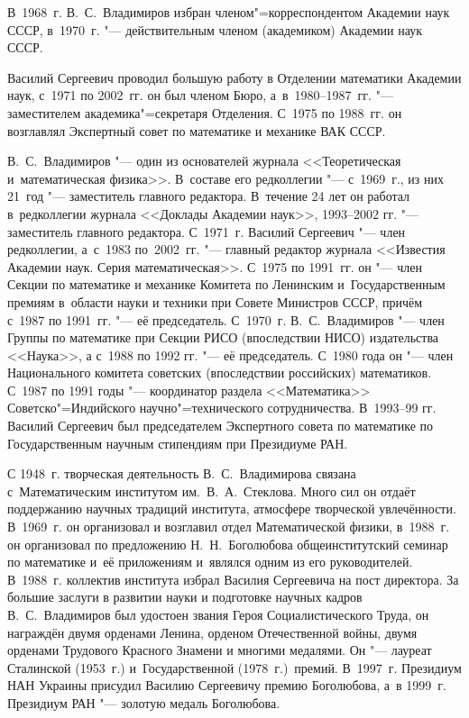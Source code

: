 В~1968~г. В.~С.~Владимиров избран членом"=корреспондентом Академии наук СССР, в~1970~г. "--- действительным членом (академиком) Академии наук СССР.


Василий Сергеевич проводил большую работу в Отделении математики Академии наук, с~1971  по 2002~гг. он был членом Бюро, а~в~1980--1987~гг. "--- заместителем академика"=секретаря Отделения. 
С~1975 по 1988~гг. он возглавлял Экспертный совет по математике и механике ВАК СССР.


В.~С.~Владимиров "--- один из основателей журнала <<Теоретическая и~математическая физика>>. 
В~составе его редколлегии "--- с~1969~г., из них 21~год "--- заместитель главного редактора. 
В~течение 24 лет он работал в~редколлегии журнала <<Доклады Академии наук>>, 1993--2002 гг. "---
заместитель главного редактора. 
С~1971~г. Василий Сергеевич "--- член редколлегии, а~с~1983 по~2002~гг. "--- главный редактор журнала <<Известия Академии наук. Серия математическая>>. 
С~1975 по 1991~гг. он "--- член Секции по математике и механике Комитета по Ленинским и~Государственным премиям в~области науки и техники при Совете Министров СССР, причём с~1987 по 1991~гг. "--- её председатель. 
С~1970~г. В.~С.~Владимиров "--- член Группы по математике при Секции РИСО (впоследствии НИСО) издательства <<Наука>>, а с~1988 по 1992 гг. "--- её председатель. 
С~1980 года он "--- член Национального комитета советских (впоследствии российских) математиков. 
С~1987 по 1991 годы "--- координатор раздела <<Математика>> Советско"=Индийского научно"=технического сотрудничества. 
В~1993--99 гг. Василий Сергеевич был председателем Экспертного совета по математике по Государственным научным стипендиям при Президиуме РАН.


С 1948~г. творческая деятельность В.~С.~Владимирова связана с~Математическим институтом им.~В.~А.~Стеклова. 
Много сил он отдаёт поддержанию научных традиций института, атмосфере творческой увлечённости. 
В~1969~г. он организовал и возглавил отдел Математической физики, в~1988~г. он организовал по  предложению Н.~Н.~Боголюбова общеинститутский семинар по математике и~её приложениям и~являлся одним из его руководителей. 
В~1988~г. коллектив института избрал Василия Сергеевича на пост директора.
За большие заслуги в развитии науки и подготовке научных кадров В.~С.~Владимиров был удостоен звания Героя Социалистического Труда, он награждён двумя орденами Ленина, орденом Отечественной войны, двумя орденами Трудового Красного Знамени и многими медалями. Он "--- лауреат Сталинской (1953~г.) и~Государственной (1978~г.)~премий. 
В~1997~г. Президиум НАН Украины присудил Василию Сергеевичу премию Боголюбова, а~в 1999~г. Президиум РАН "--- золотую медаль Боголюбова.



